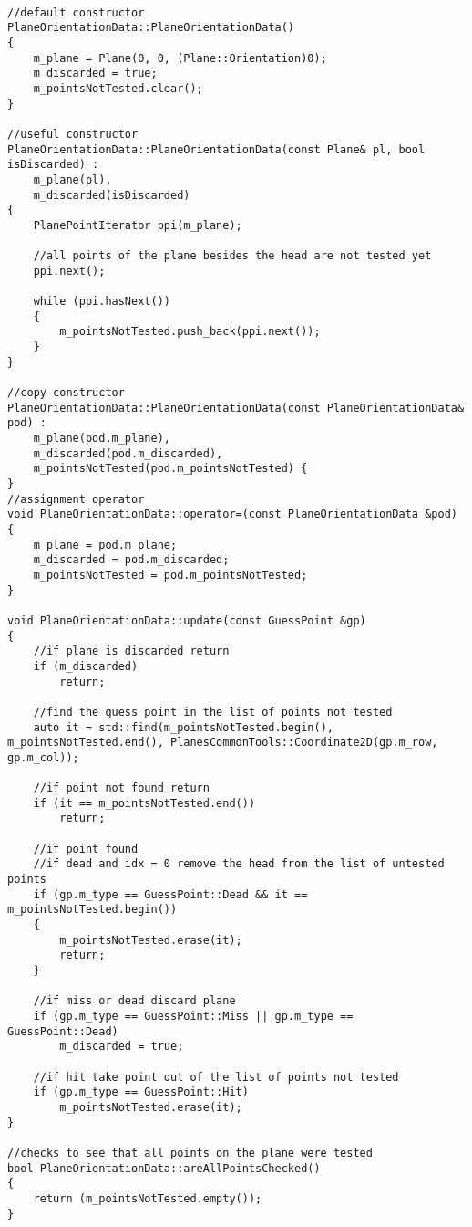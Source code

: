 \begin{lstlisting}

//default constructor
PlaneOrientationData::PlaneOrientationData()
{
	m_plane = Plane(0, 0, (Plane::Orientation)0);
	m_discarded = true;
	m_pointsNotTested.clear();
}

//useful constructor
PlaneOrientationData::PlaneOrientationData(const Plane& pl, bool isDiscarded) :
	m_plane(pl),
	m_discarded(isDiscarded)
{
	PlanePointIterator ppi(m_plane);
	
	//all points of the plane besides the head are not tested yet
	ppi.next();

	while (ppi.hasNext())
	{
		m_pointsNotTested.push_back(ppi.next());
	}
}

//copy constructor
PlaneOrientationData::PlaneOrientationData(const PlaneOrientationData& pod) :
	m_plane(pod.m_plane),
	m_discarded(pod.m_discarded),
	m_pointsNotTested(pod.m_pointsNotTested) {
}
//assignment operator
void PlaneOrientationData::operator=(const PlaneOrientationData &pod)
{
	m_plane = pod.m_plane;
	m_discarded = pod.m_discarded;
	m_pointsNotTested = pod.m_pointsNotTested;
}

void PlaneOrientationData::update(const GuessPoint &gp)
{
	//if plane is discarded return
	if (m_discarded)
		return;
	
	//find the guess point in the list of points not tested
	auto it = std::find(m_pointsNotTested.begin(), m_pointsNotTested.end(), PlanesCommonTools::Coordinate2D(gp.m_row, gp.m_col));
	
	//if point not found return
	if (it == m_pointsNotTested.end())
		return;
	
	//if point found
	//if dead and idx = 0 remove the head from the list of untested points
	if (gp.m_type == GuessPoint::Dead && it == m_pointsNotTested.begin())
	{
		m_pointsNotTested.erase(it);
		return;
	}
	
	//if miss or dead discard plane
	if (gp.m_type == GuessPoint::Miss || gp.m_type == GuessPoint::Dead)
		m_discarded = true;
	
	//if hit take point out of the list of points not tested
	if (gp.m_type == GuessPoint::Hit)
		m_pointsNotTested.erase(it);
}

//checks to see that all points on the plane were tested
bool PlaneOrientationData::areAllPointsChecked()
{
	return (m_pointsNotTested.empty());
}

\end{lstlisting}